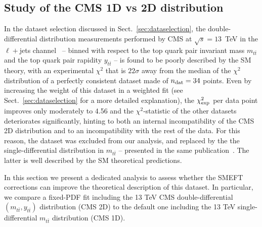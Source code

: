 \documentclass[withindex,glossary]{cam-thesis}
\begin{document}
\subsection{Study of the CMS 1D vs 2D distribution}
\label{subsec:cms1dvs2d}
In the dataset selection discussed in Sect.~\ref{sec:dataselection}, 
the double-differential distribution measurements performed by CMS at $\sqrt{s}=13$~TeV
in the $\ell+$jets channel~\cite{CMS:2021vhb} -- binned with respect to the top
quark pair invariant mass $m_{t\bar{t}}$ and the top quark pair rapidity $y_{t\bar{t}}$ -- is found to be poorly described by the
SM theory, with an experimental $\chi^2$ that is $22\sigma$ 
away from the median of the $\chi^2$ distribution of a
perfectly consistent dataset made of $n_{\rm dat}=34$ points.
Even by increasing the weight of this dataset in a weighted fit (see Sect.~\ref{sec:dataselection} for a more
detailed explanation), the $\chi^2_{\rm exp}$ per data point improves
only moderately to 4.56 and the  $\chi^2$-statistic of the other datasets deteriorates significantly, hinting
to both an internal incompatibility of the CMS 2D distribution and to an incompatibility with the rest of the data. 
For this reason, the dataset was excluded from our analysis, and replaced by the the single-differential
distribution in $m_{t\bar{t}}$ -- presented in the same publication~\cite{CMS:2021vhb}. The latter is well 
described by the SM theoretical predictions. 

 In this section we present a dedicated analysis to assess whether the SMEFT corrections can improve the
 theoretical description of this dataset. In particular, we compare a fixed-PDF fit including the 13 TeV
 CMS double-differential $(m_{t\bar{t}},y_{t\bar{t}})$  distribution (CMS 2D)
 to the default one including the 13 TeV single-differential $m_{t\bar{t}}$ distribution (CMS 1D).
\end{document}
